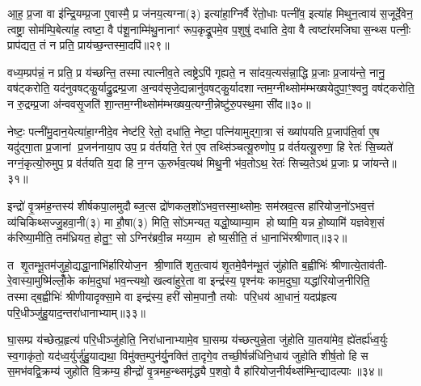 आ॒ह॒ प्र॒जा वा इ॑न्द्रि॒यम्प्र॒जा ए॒वास्मै॒ प्र ज॑नय॒त्यग्ना(३) इत्या॑हा॒ग्निर्वै रे॑तो॒धाः पत्नी॑व॒ इत्या॑ह मिथुन॒त्वाय॑ स॒जूर्दे॒वेन॒ त्वष्ट्रा॒ सोम॑म्पि॒बेत्या॑ह॒ त्वष्टा॒ वै प॑शू॒नाम्मि॑थु॒नानाꣳ॑ रूप॒कृद्रू॒पमे॒व प॒शुषु॑ दधाति दे॒वा वै त्वष्टा॑रमजिघास॒न्थ्स पत्नीः॒ प्राप॑द्यत॒ तं न प्रति॒ प्राय॑च्छ॒न्तस्मा॒दपि॑॥२९॥

वध्य॒म्प्रप॑न्नं॒ न प्रति॒ प्र य॑च्छन्ति॒ तस्मात्पात्नीव॒ते त्वष्ट्रेऽपि॑ गृह्यते॒ न सा॑दय॒त्यस॑न्ना॒द्धि प्र॒जाः प्र॒जाय॑न्ते॒ नानु॒ वष॑ट्करोति॒ यद॑नुवषट्कु॒र्याद्रु॒द्रम्प्र॒जा अ॒न्वव॑सृजे॒द्यन्नानु॑वषट्कु॒र्यादशान्तम॒ग्नीथ्सोम॑म्भख्षयेदुपा॒ꣳ॒श्वनु॒ वष॑ट्करोति॒ न रु॒द्रम्प्र॒जा अ॑न्ववसृ॒जति॑ शा॒न्तम॒ग्नीथ्सोम॑म्भख्षय॒त्यग्नी॒न्नेष्टु॑रु॒पस्थ॒मा सी॑द॥३०॥

नेष्टः॒ पत्नी॑मु॒दान॒येत्या॑हा॒ग्नीदे॒व नेष्ट॑रि॒ रेतो॒ दधा॑ति॒ नेष्टा॒ पत्नि॑यामुद्गा॒त्रा सं ख्या॑पयति प्र॒जाप॑ति॒र्वा ए॒ष यदु॑द्गा॒ता प्र॒जानां प्र॒जन॑नाया॒प उप॒ प्र व॑र्तयति॒ रेत॑ ए॒व तथ्सि॑ञ्चत्यू॒रुणोप॒ प्र व॑र्तयत्यू॒रुणा॒ हि रेतः॑ सि॒च्यते॑ नग्नं॒कृत्यो॒रुमुप॒ प्र व॑र्तयति य॒दा हि न॒ग्न ऊ॒रुर्भव॒त्यथ॑ मिथु॒नी भ॑व॒तोऽथ॒ रेतः॑ सिच्य॒तेऽथ॑ प्र॒जाः प्र जा॑यन्ते॥३१॥

{\anuvakamend[{पत्नीः सुव॒र्गमुप॑स्तितरमिन्द्रियाव॒ इत्यपि॑ सीद मिथु॒न्य॑ष्टौ च॑॥८॥}]}

इन्द्रो॑ वृ॒त्रम॑ह॒न्तस्य॑ शीर्\mbox{}षकपा॒लमुदौब्ज॒त्स द्रो॑णकल॒शो॑ऽभव॒त्तस्मा॒थ्सोमः॒ सम॑स्रव॒त्स हा॑रियोज॒नो॑ऽभव॒त्तं व्य॑चिकिथ्सज्जु॒हवा॒नी(३) मा हौ॒षा(३) मिति॒ सो॑ऽमन्यत॒ यद्धो॒ष्याम्या॒म होष्यामि॒ यन्न हो॒ष्यामि॑ यज्ञवेश॒सं क॑रिष्या॒मीति॒ तम॑ध्रियत॒ होतु॒ꣳ॒ सोऽग्निर॑ब्रवी॒न्न मय्या॒म होष्य॒सीति॒ तं धा॒नाभि॑रश्रीणात्॥३२॥

त शृ॒तम्भू॒तम॑जुहो॒द्यद्धा॒नाभि॑र्\mbox{}हारियोज॒न श्री॒णाति॑ शृत॒त्वाय॑ शृ॒तमे॒वैन॑म्भू॒तं जु॑होति ब॒ह्वीभिः॑ श्रीणात्ये॒ताव॑ती- रे॒वास्या॒मुष्मि॑ल्लोँ॒के का॑म॒दुघा॑ भव॒न्त्यथो॒ खल्वा॑हुरे॒ता वा इन्द्र॑स्य॒ पृश्न॑यः काम॒दुघा॒ यद्धा॑रियोज॒नीरिति॒ तस्माद्ब॒ह्वीभिः॑ श्रीणीयादृक्सा॒मे वा इन्द्र॑स्य॒ हरी॑ सोम॒पानौ॒ तयोः परि॒धय॑ आ॒धानं॒ यदप्र॑हृत्य परि॒धीञ्जु॑हु॒याद॒न्तरा॑धानाभ्याम्॥३३॥

घा॒सम्प्र य॑च्छेत्प्र॒हृत्य॑ परि॒धीञ्जु॑होति॒ निरा॑धानाभ्यामे॒व घा॒सम्प्र य॑च्छत्युन्ने॒ता जु॑होति या॒तया॑मेव॒ ह्ये॑तर्\mbox{}ह्य॑ध्व॒र्युः स्व॒गाकृ॑तो॒ यद॑ध्व॒र्युर्जु॑हु॒याद्यथा॒ विमु॑क्त॒म्पुन॑र्यु॒नक्ति॑ ता॒दृगे॒व तच्छी॒र्\mbox{}षन्न॑धिनि॒धाय॑ जुहोति शीर्\mbox{}ष॒तो हि स स॒मभ॑वद्वि॒क्रम्य॑ जुहोति वि॒क्रम्य॒ हीन्द्रो॑ वृ॒त्रमह॒न्थ्समृ॑द्ध्यै प॒शवो॒ वै हा॑रियोज॒नीर्यथ्स॑म्भि॒न्द्यादल्पाः॥३४॥

